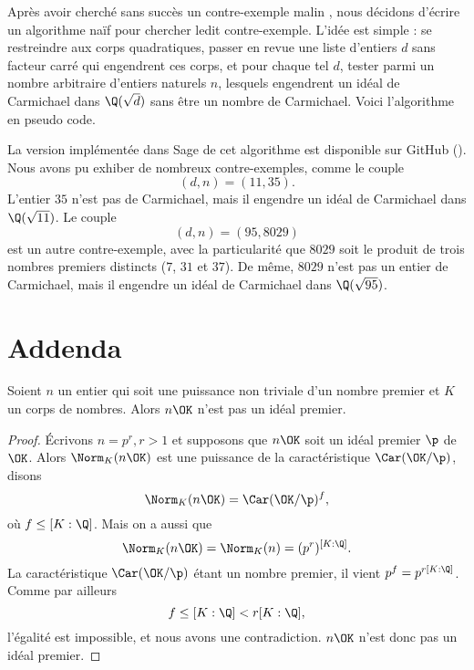 \documentclass[a4paper, 12pt, oneside]{article}
\begin{document}
Après avoir cherché sans succès un contre-exemple \og{} malin \fg, nous décidons d'écrire un algorithme naïf pour chercher ledit contre-exemple. L'idée est simple : se restreindre aux corps quadratiques, passer en revue une liste d'entiers $d$ sans facteur carré qui engendrent ces corps, et pour chaque tel $d$, tester parmi un nombre arbitraire d'entiers naturels $n$, lesquels engendrent un idéal de Carmichael dans $\Q(\sqrt{d})$ sans être un nombre de Carmichael. Voici l'algorithme en pseudo code. \\

\begin{algorithm}[H]
\end{algorithm}

\vspace{1em}
La version implémentée dans Sage de cet algorithme est disponible sur GitHub (). Nous avons pu exhiber de nombreux contre-exemples, comme le couple $$(d, n) = (11, 35).$$ L'entier $35$ n'est pas de Carmichael, mais il engendre un idéal de Carmichael dans $\Q(\sqrt{11})$. Le couple $$(d, n) = (95,8029)$$ est un autre contre-exemple, avec la particularité que $8029$ soit le produit de trois nombres premiers distincts ($7$, $31$ et $37$). De même, $8029$ n'est pas un entier de Carmichael, mais il engendre un idéal de Carmichael dans $\Q(\sqrt{95})$.

\section{Addenda}

\begin{fait}
Soient $n$ un entier qui soit une puissance non triviale d'un nombre premier et $ K$ un corps de nombres. Alors $n\OK$ n'est pas un idéal premier.
\end{fait}

\begin{proof}
Écrivons $n = p^r, r>1$ et supposons que $n\OK$ soit un idéal premier $\p$ de $\OK$. Alors $\Norm_K(n\OK)$ est une puissance de la caractéristique $\Car(\OK/\p)$, disons $$\Norm_K(n\OK) = \Car(\OK/\p)^f,$$ où $f \leq [K : \Q]$. Mais on a aussi que $$\Norm_K(n\OK) = \Norm_K(n) = (p^r)^{[K : \Q]}.$$ La caractéristique $\Car(\OK/\p)$ étant un nombre premier, il vient $p^f = p^{r[K : \Q]}$. Comme par ailleurs $$f \leq [K : \Q] < r[K : \Q],$$ l'égalité est impossible, et nous avons une contradiction. $n\OK$ n'est donc pas un idéal premier.
\end{proof}
\end{document}
